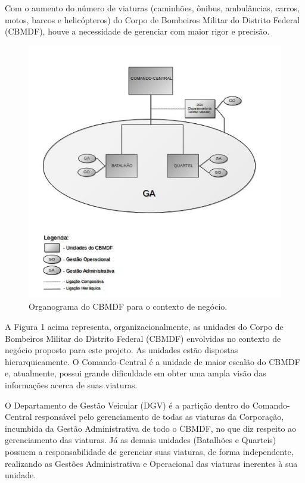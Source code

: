   Com o aumento do número de viaturas (caminhões, ônibus, ambulâncias, carros, motos, barcos e helicópteros) do Corpo de 
  Bombeiros Militar do Distrito Federal (CBMDF), houve a necessidade de gerenciar com maior rigor e precisão.

  \begin{figure}[!htbp]
    \centering
    \includegraphics[scale=0.7, angle=0]{figuras/entendimento_negocio}
    \caption{Organograma do CBMDF para o contexto de negócio.}
  \end{figure}
  
  A Figura 1 acima representa, organizacionalmente, as unidades do Corpo de Bombeiros Militar do Distrito Federal (CBMDF)
  envolvidas no contexto de negócio proposto para este projeto. As unidades estão dispostas hierarquicamente. 
  O Comando-Central é a unidade de maior escalão do CBMDF e, atualmente, possui grande dificuldade em obter uma ampla 
  visão das informações acerca de suas viaturas.
  
  O Departamento de Gestão Veicular (DGV) é a partição dentro do Comando-Central responsável pelo gerenciamento de todas 
  as viaturas da Corporação, incumbida da Gestão Administrativa de todo o CBMDF, no que diz respeito ao gerenciamento das 
  viaturas. Já as demais unidades (Batalhões e Quarteis) possuem a responsabilidade de gerenciar suas viaturas, de forma 
  independente, realizando as Gestões Administrativa e Operacional das viaturas inerentes à sua unidade.
  
